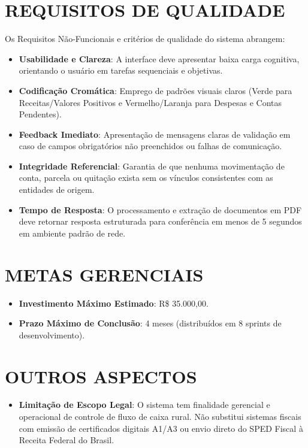 \documentclass[
	12pt,
	oneside,
	a4paper,
	brazilian
]{abntex2}
\begin{document}
\chapter{REQUISITOS DE QUALIDADE}

Os Requisitos Não-Funcionais e critérios de qualidade do sistema abrangem:

\begin{itemize}[leftmargin=1.5cm]
	\item \textbf{Usabilidade e Clareza}: A interface deve apresentar baixa carga cognitiva, orientando o usuário em tarefas sequenciais e objetivas.
	\item \textbf{Codificação Cromática}: Emprego de padrões visuais claros (Verde para Receitas/Valores Positivos e Vermelho/Laranja para Despesas e Contas Pendentes).
	\item \textbf{Feedback Imediato}: Apresentação de mensagens claras de validação em caso de campos obrigatórios não preenchidos ou falhas de comunicação.
	\item \textbf{Integridade Referencial}: Garantia de que nenhuma movimentação de conta, parcela ou quitação exista sem os vínculos consistentes com as entidades de origem.
	\item \textbf{Tempo de Resposta}: O processamento e extração de documentos em PDF deve retornar resposta estruturada para conferência em menos de 5 segundos em ambiente padrão de rede.
\end{itemize}

\chapter{METAS GERENCIAIS}

\begin{itemize}[leftmargin=1.5cm]
	\item \textbf{Investimento Máximo Estimado}: R\$ 35.000,00.
	\item \textbf{Prazo Máximo de Conclusão}: 4 meses (distribuídos em 8 sprints de desenvolvimento).
\end{itemize}

\chapter{OUTROS ASPECTOS}

\begin{itemize}[leftmargin=1.5cm]
	\item \textbf{Limitação de Escopo Legal}: O sistema tem finalidade gerencial e operacional de controle de fluxo de caixa rural. Não substitui sistemas fiscais com emissão de certificados digitais A1/A3 ou envio direto do SPED Fiscal à Receita Federal do Brasil.
\end{itemize}
\end{document}
